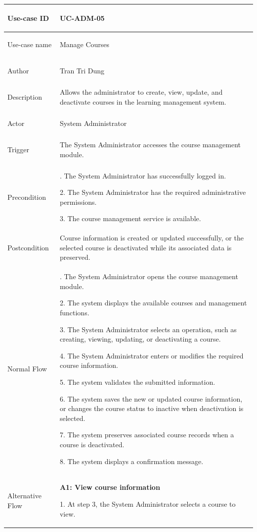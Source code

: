 \begin{longtable}{|>{\bfseries\raggedright\arraybackslash}p{}|>{\raggedright\arraybackslash}p{}|}
\hline
Use-case ID & UC-ADM-05 \\ \hline
Use-case name & Manage Courses \\ \hline
Author & Tran Tri Dung \\ \hline
Description & Allows the administrator to create, view, update, and deactivate courses in the learning management system. \\ \hline
Actor & System Administrator \\ \hline
Trigger & The System Administrator accesses the course management module. \\ \hline
Precondition &
1. The System Administrator has successfully logged in. \par
2. The System Administrator has the required administrative permissions. \par
3. The course management service is available. \\ \hline
Postcondition & Course information is created or updated successfully, or the selected course is deactivated while its associated data is preserved. \\ \hline
Normal Flow &
1. The System Administrator opens the course management module. \par
2. The system displays the available courses and management functions. \par
3. The System Administrator selects an operation, such as creating, viewing, updating, or deactivating a course. \par
4. The System Administrator enters or modifies the required course information. \par
5. The system validates the submitted information. \par
6. The system saves the new or updated course information, or changes the course status to inactive when deactivation is selected. \par
7. The system preserves associated course records when a course is deactivated. \par
8. The system displays a confirmation message. \\ \hline
Alternative Flow &
\textbf{A1: View course information} \par
1. At step 3, the System Administrator selects a course to view. \par

\end{longtable}
